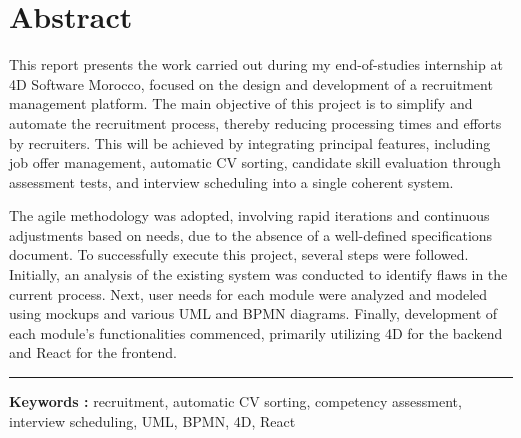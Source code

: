     
    \chapter*{Abstract}    


\begin{spacing}{1.25}

This report presents the work carried out during my end-of-studies internship at 4D Software Morocco, focused on the design and development of a recruitment management platform. 
The main objective of this project is to simplify and 
automate the recruitment process, thereby reducing processing 
times and efforts by recruiters. This will be achieved by 
integrating principal features, including job offer management, automatic CV sorting, candidate skill evaluation through assessment tests, and interview scheduling into a single coherent system.
\newline

The agile methodology was adopted, involving rapid iterations and continuous adjustments based on needs, due to the absence of a well-defined specifications document. To successfully execute this project, several steps were followed. Initially, an analysis of the existing system was conducted to identify flaws in the current process. Next, user needs for each module were analyzed and modeled using mockups and various UML and BPMN diagrams. Finally, development of each module's functionalities commenced, primarily utilizing 4D for the backend and React for the frontend.
\newline


\end{spacing}

\vspace{1cm}
\noindent\rule[2pt]{\textwidth}{0.5pt}
\textbf{Keywords :} recruitment, automatic CV sorting, competency assessment, interview scheduling, UML, BPMN, 4D, React
